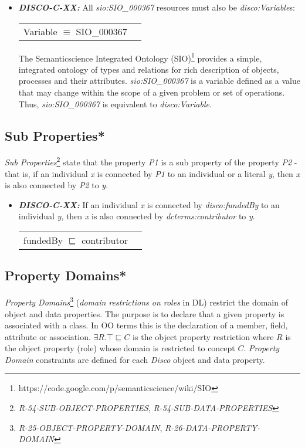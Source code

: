 \documentclass{llncs}
\newenvironment{DL}{
  \vspace{0cm}
  \begin{tabular}{r l}

}{
  \end{tabular}
}
\begin{document}
\begin{itemize}
	\item \textbf{{\em DISCO-C-XX:}}
All {\em sio:SIO\_000367} resources must also be {\em disco:Variable}s:

\begin{DL}
Variable $\equiv$ SIO\_000367
\end{DL}

The Semanticscience Integrated Ontology (SIO)\footnote{https://code.google.com/p/semanticscience/wiki/SIO} provides a simple, integrated ontology of types and relations for rich description of objects, processes and their attributes.
{\em sio:SIO\_000367} is a variable defined as a value that may change within the scope of a given problem or set of operations.
Thus, {\em sio:SIO\_000367} is equivalent to {\em disco:Variable}.
\end{itemize}

\subsection{Sub Properties*}

{\em Sub Properties}\footnote{\emph{R-54-SUB-OBJECT-PROPERTIES}, \emph{R-54-SUB-DATA-PROPERTIES}} state that the property \emph{P1} is a sub property of the property \emph{P2} - that is, if an individual \emph{x} is connected by \emph{P1} to an individual or a literal \emph{y}, then \emph{x} is also connected by \emph{P2} to \emph{y}. 

\begin{itemize}
	\item \textbf{{\em DISCO-C-XX:}}
If an individual \emph{x} is connected by {\em disco:fundedBy} to an individual \emph{y}, then \emph{x} is also connected by {\em dcterms:contributor} to \emph{y}. 

\begin{DL}
fundedBy $\sqsubseteq$ contributor 
\end{DL}
\end{itemize}

\subsection{Property Domains*}

{\em Property Domains}\footnote{{\em R-25-OBJECT-PROPERTY-DOMAIN}, {\em R-26-DATA-PROPERTY-DOMAIN}} ({\em domain restrictions on roles} in DL) restrict the domain of object and data properties.
The purpose is to declare that a given property is associated with a class. 
In OO terms this is the declaration of a member, field, attribute or association. 
$\exists R. \top \sqsubseteq C$ is the object property restriction where $R$ is the object property (role) whose domain is restricted to concept $C$.
{\em Property Domain} constraints are defined for each \emph{Disco} object and data property.
\end{document}
